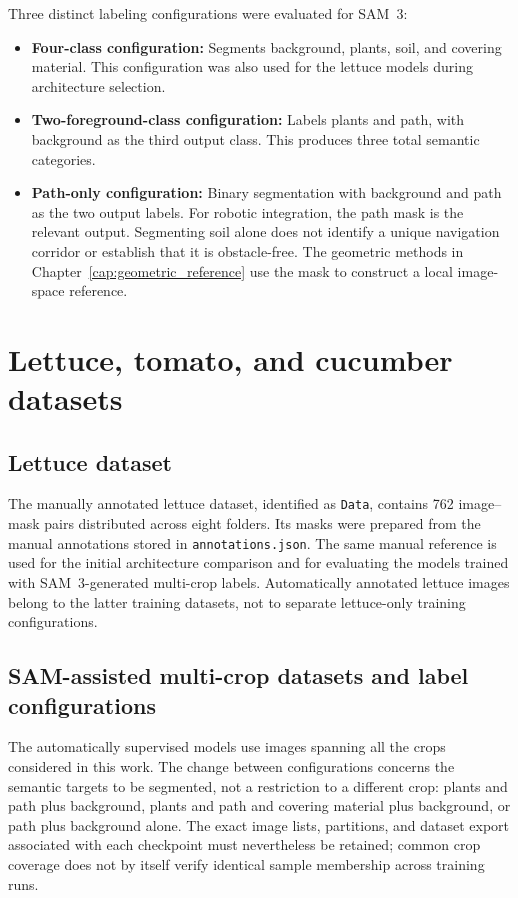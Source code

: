 Three distinct labeling configurations were evaluated for SAM~3:
\begin{itemize}
\item \textbf{Four-class configuration:} Segments background, plants, soil, and covering material. This configuration was also used for the lettuce models during architecture selection.
\item \textbf{Two-foreground-class configuration:} Labels plants and path, with background as the third output class. This produces three total semantic categories.
\item \textbf{Path-only configuration:} Binary segmentation with background and path as the two output labels. For robotic integration, the path mask is the relevant output. Segmenting soil alone does not identify a unique navigation corridor or establish that it is obstacle-free. The geometric methods in Chapter~\ref{cap:geometric_reference} use the mask to construct a local image-space reference.
\end{itemize}

\section{Lettuce, tomato, and cucumber datasets}
\label{sec:c3_datasets}

\subsection{Lettuce dataset}
\label{subsec:c3_lettuce}

The manually annotated lettuce dataset, identified as \texttt{Data},
contains 762 image--mask pairs distributed across eight folders. Its
masks were prepared from the manual annotations stored in
\texttt{annotations.json}. The same manual reference is used for the
initial architecture comparison and for evaluating the models trained
with SAM~3-generated multi-crop labels. Automatically annotated lettuce
images belong to the latter training datasets, not to separate
lettuce-only training configurations.

\subsection{SAM-assisted multi-crop datasets and label configurations}
\label{subsec:c3_multicrop_path}

The automatically supervised models use images spanning all the crops
considered in this work. The change between configurations concerns the
semantic targets to be segmented, not a restriction to a different crop:
plants and path plus background, plants and path and covering material
plus background, or path plus background alone. The exact image lists,
partitions, and dataset export associated with each checkpoint must
nevertheless be retained; common crop coverage does not by itself verify
identical sample membership across training runs.

